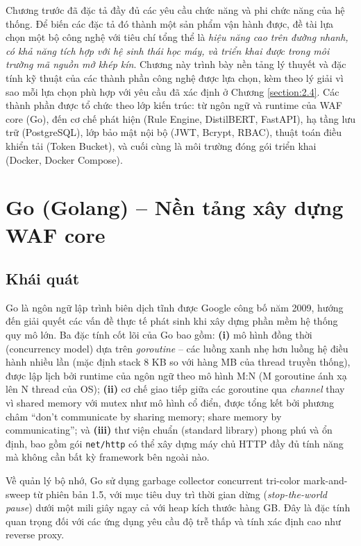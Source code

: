 \documentclass[../DoAn.tex]{subfiles}
\begin{document}
Chương trước đã đặc tả đầy đủ các yêu cầu chức năng và phi chức năng của hệ
thống. Để biến các đặc tả đó thành một sản phẩm vận hành được, đề tài lựa
chọn một bộ công nghệ với tiêu chí tổng thể là \textit{hiệu năng cao trên đường
nhanh, có khả năng tích hợp với hệ sinh thái học máy, và triển khai được trong
môi trường mã nguồn mở khép kín}. Chương này trình bày nền tảng lý thuyết và
đặc tính kỹ thuật của các thành phần công nghệ được lựa chọn, kèm theo lý giải
vì sao mỗi lựa chọn phù hợp với yêu cầu đã xác định ở Chương \ref{section:2.4}.
Các thành phần được tổ chức theo lớp kiến trúc: từ ngôn ngữ và runtime của
WAF core (Go), đến cơ chế phát hiện (Rule Engine, DistilBERT, FastAPI), hạ
tầng lưu trữ (PostgreSQL), lớp bảo mật nội bộ (JWT, Bcrypt, RBAC), thuật toán
điều khiển tải (Token Bucket), và cuối cùng là môi trường đóng gói triển khai
(Docker, Docker Compose).

\section{Go (Golang) -- Nền tảng xây dựng WAF core}
\label{section:3.1}

\subsection{Khái quát}
\label{subsection:3.1.1}

Go là ngôn ngữ lập trình biên dịch tĩnh được Google công bố năm 2009, hướng
đến giải quyết các vấn đề thực tế phát sinh khi xây dựng phần mềm hệ thống
quy mô lớn. Ba đặc tính cốt lõi của Go bao gồm: \textbf{(i)} mô hình đồng thời
(concurrency model) dựa trên \textit{goroutine} -- các luồng xanh nhẹ hơn
luồng hệ điều hành nhiều lần (mặc định stack 8 KB so với hàng MB của thread
truyền thống), được lập lịch bởi runtime của ngôn ngữ theo mô hình M:N (M
goroutine ánh xạ lên N thread của OS); \textbf{(ii)} cơ chế giao tiếp giữa các
goroutine qua \textit{channel} thay vì shared memory với mutex như mô hình
cổ điển, được tổng kết bởi phương châm ``don't communicate by sharing memory;
share memory by communicating''; và \textbf{(iii)} thư viện chuẩn (standard
library) phong phú và ổn định, bao gồm gói \texttt{net/http} có thể xây dựng
máy chủ HTTP đầy đủ tính năng mà không cần bất kỳ framework bên ngoài nào.

Về quản lý bộ nhớ, Go sử dụng garbage collector concurrent tri-color
mark-and-sweep từ phiên bản 1.5, với mục tiêu duy trì thời gian dừng
(\textit{stop-the-world pause}) dưới một mili giây ngay cả với heap kích
thước hàng GB. Đây là đặc tính quan trọng đối với các ứng dụng yêu cầu độ
trễ thấp và tính xác định cao như reverse proxy.
\end{document}
